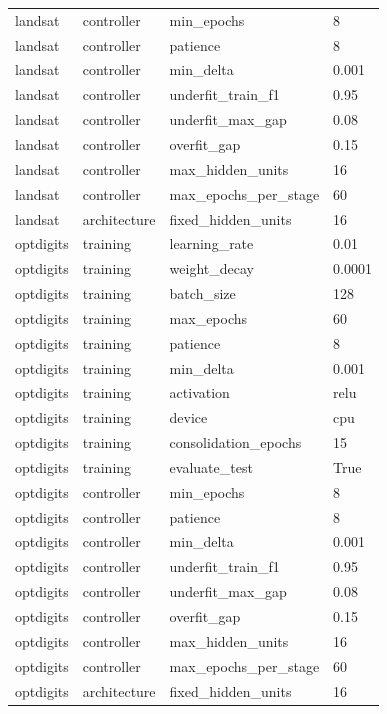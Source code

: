 \begin{tabular}{llll}
landsat & controller & min\_epochs & 8 \\
landsat & controller & patience & 8 \\
landsat & controller & min\_delta & 0.001 \\
landsat & controller & underfit\_train\_f1 & 0.95 \\
landsat & controller & underfit\_max\_gap & 0.08 \\
landsat & controller & overfit\_gap & 0.15 \\
landsat & controller & max\_hidden\_units & 16 \\
landsat & controller & max\_epochs\_per\_stage & 60 \\
landsat & architecture & fixed\_hidden\_units & 16 \\
optdigits & training & learning\_rate & 0.01 \\
optdigits & training & weight\_decay & 0.0001 \\
optdigits & training & batch\_size & 128 \\
optdigits & training & max\_epochs & 60 \\
optdigits & training & patience & 8 \\
optdigits & training & min\_delta & 0.001 \\
optdigits & training & activation & relu \\
optdigits & training & device & cpu \\
optdigits & training & consolidation\_epochs & 15 \\
optdigits & training & evaluate\_test & True \\
optdigits & controller & min\_epochs & 8 \\
optdigits & controller & patience & 8 \\
optdigits & controller & min\_delta & 0.001 \\
optdigits & controller & underfit\_train\_f1 & 0.95 \\
optdigits & controller & underfit\_max\_gap & 0.08 \\
optdigits & controller & overfit\_gap & 0.15 \\
optdigits & controller & max\_hidden\_units & 16 \\
optdigits & controller & max\_epochs\_per\_stage & 60 \\
optdigits & architecture & fixed\_hidden\_units & 16 \\
\bottomrule
\end{tabular}
